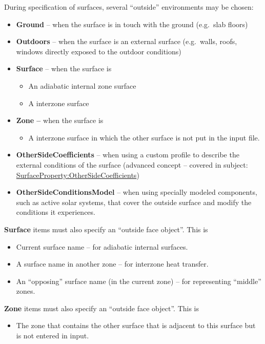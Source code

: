 During specification of surfaces, several ``outside'' environments may be chosen:

\begin{itemize}
\item
  \textbf{Ground} -- when the surface is in touch with the ground (e.g.~slab floors)
\item
  \textbf{Outdoors} -- when the surface is an external surface (e.g.~walls, roofs, windows directly exposed to the outdoor conditions)
\item
  \textbf{Surface} -- when the surface is
  \begin{itemize}
    \item
      An adiabatic internal zone surface
    \item
      A interzone surface
  \end{itemize}
\item
  \textbf{Zone --} when the surface is
  \begin{itemize}
    \item
      A interzone surface in which the other surface is not put in the input file.
  \end{itemize}
\item
  \textbf{OtherSideCoefficients} -- when using a custom profile to describe the external conditions of the surface (advanced concept -- covered in subject: \hyperref[surfacepropertyothersidecoefficients]{SurfaceProperty:OtherSideCoefficients})
\item
  \textbf{OtherSideConditionsModel} -- when using specially modeled components, such as active solar systems, that cover the outside surface and modify the conditions it experiences.
\end{itemize}

\textbf{Surface} items must also specify an ``outside face object''. This is

\begin{itemize}
\tightlist
\item
  Current surface name -- for adiabatic internal surfaces.
\item
  A surface name in another zone -- for interzone heat transfer.
\item
  An ``opposing'' surface name (in the current zone) -- for representing ``middle'' zones.
\end{itemize}

\textbf{Zone} items must also specify an ``outside face object''. This is

\begin{itemize}
\tightlist
\item
  The zone that contains the other surface that is adjacent to this surface but is not entered in input.
\end{itemize}

